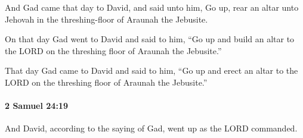 			\begin{versebox}
					\item[BHS] 
					\item[ASV] And Gad came that day to David, and said unto him, Go up, rear an altar unto Jehovah in the threshing-floor of Araunah the Jebusite.
					\item[NIV] On that day Gad went to David and said to him, “Go up and build an altar to the LORD on the threshing floor of Araunah the Jebusite.”
					\item[NRSV] That day Gad came to David and said to him, “Go up and erect an altar to the LORD on the threshing floor of Araunah the Jebusite.”
			\end{versebox}

		\paragraph{2 Samuel 24:19} %
			\label{2SAMUEL-24-19}

			And David, according to the saying of Gad, went up as the LORD commanded.

